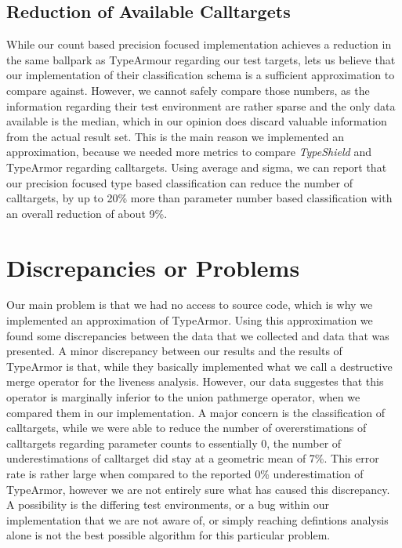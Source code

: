 \subsection{Reduction of Available Calltargets}
While our count based precision focused implementation achieves a reduction in the same ballpark as TypeArmour regarding our test targets, lets us believe that our implementation of their classification schema is a sufficient approximation to compare against. However, we cannot safely compare those numbers, as the information regarding their test environment are rather sparse and the only data available is the median, which in our opinion does discard valuable information from the actual result set. This is the main reason we implemented an approximation, because we needed more metrics to compare \textit{TypeShield} and TypeArmor regarding calltargets. Using average and sigma, we can report that our precision focused type based classification can reduce the number of calltargets, by up to 20\% more than parameter number based classification with an overall reduction of about 9\%.


\section{Discrepancies or Problems}
Our main problem is that we had no access to source code, which is why we implemented an approximation of TypeArmor. Using this approximation we found some discrepancies between the data that we collected and data that was presented.
A minor discrepancy between our results and the results of TypeArmor is that, while they basically implemented what we call a destructive merge operator for the liveness analysis. However, our data suggestes that this operator is marginally inferior to the union pathmerge operator, when we compared them in our implementation.
A major concern is the classification of calltargets, while we were able to reduce the number of overerstimations of calltargets regarding parameter counts to essentially 0, the number of underestimations of calltarget did stay at a geometric mean of 7\%. This error rate is rather large when compared to the reported 0\% underestimation of TypeArmor, however we are not entirely sure what has caused this discrepancy. A possibility is the differing test environments, or a bug within our implementation that we are not aware of, or simply reaching defintions analysis alone is not the best possible algorithm for this particular problem.

